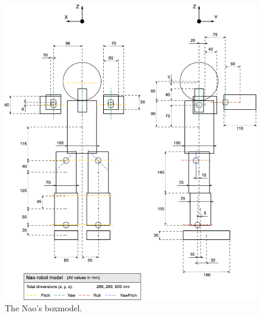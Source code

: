 \begin{figure}[b!]
  \centering
    \includegraphics[width=\textwidth]{fig/nao_boxmodel}
  \caption{The Nao's boxmodel.}
  \label{fig:nao_boxmodel}
\end{figure}

